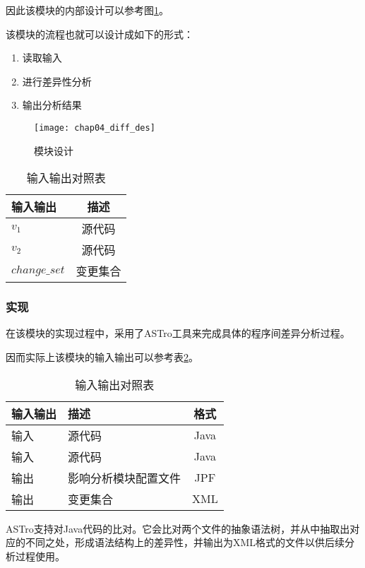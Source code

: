 因此该模块的内部设计可以参考图\ref {des_diff}。

该模块的流程也就可以设计成如下的形式：
\begin{enumerate}
	\item 读取输入
	\item 进行差异性分析
	\item 输出分析结果
\end{enumerate}

\begin{figure}[H]
	\centering
	\texttt{[image: chap04\_diff\_des]}
	\caption {模块设计}
	\label {des_diff}	
\end{figure}


\begin{table}
	\caption{输入输出对照表}
	\label{differ_io}
	\centering
	\begin{tabular}{lc}
		\toprule[1.5pt]
		{\heiti 输入输出} & {\heiti 描述}\\\midrule[1pt]
		$v_1$ & 源代码 \\
		$v_2$ & 源代码 \\
		$change\_set$ & 变更集合 \\
		\bottomrule[1.5pt]
	\end{tabular}
\end{table}

\subsubsection{实现}

在该模块的实现过程中，采用了ASTro工具来完成具体的程序间差异分析过程。

因而实际上该模块的输入输出可以参考表\ref {differ_io2}。

\begin{table}[H]
	\caption{输入输出对照表}
	\label{differ_io2}
	\centering
	\begin{tabular}{llc}
		\toprule[1.5pt]
		{\heiti 输入输出} & {\heiti 描述} & {\heiti 格式}\\\midrule[1pt]
		输入 & 源代码 & Java\\
		输入 & 源代码 & Java\\
		输出 & 影响分析模块配置文件 & JPF\\
		输出 & 变更集合 & XML\\
		\bottomrule[1.5pt]
	\end{tabular}
\end{table}

ASTro支持对Java代码的比对。它会比对两个文件的抽象语法树，并从中抽取出对应的不同之处，形成语法结构上的差异性，并输出为XML格式的文件以供后续分析过程使用。

